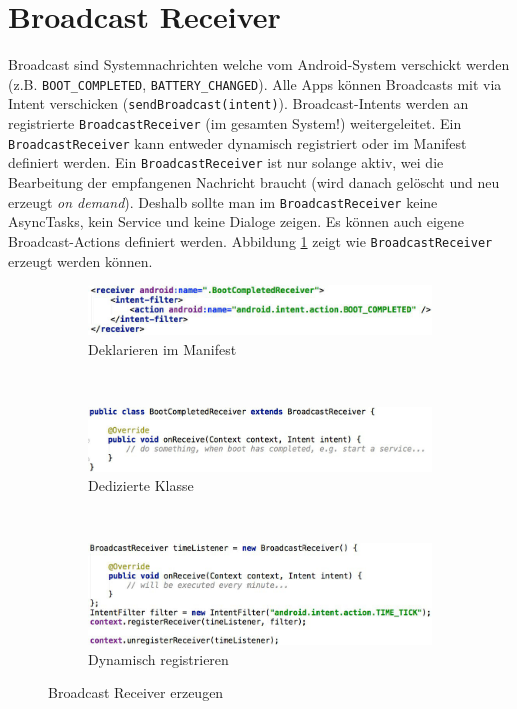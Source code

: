 \section{Broadcast Receiver}

Broadcast sind Systemnachrichten welche vom Android-System verschickt werden (z.B. \texttt{BOOT\_COMPLETED}, \texttt{BATTERY\_CHANGED}). Alle Apps können Broadcasts mit via Intent verschicken (\texttt{sendBroadcast(intent)}). Broadcast-Intents werden an registrierte \texttt{BroadcastReceiver} (im gesamten System!) weitergeleitet. Ein \texttt{BroadcastReceiver} kann entweder dynamisch registriert oder im Manifest definiert werden. Ein \texttt{BroadcastReceiver} ist nur solange aktiv, wei die Bearbeitung der empfangenen Nachricht braucht (wird danach gelöscht und neu erzeugt \emph{on demand}). Deshalb sollte man im \texttt{BroadcastReceiver} keine AsyncTasks, kein Service und keine Dialoge zeigen. Es können auch eigene Broadcast-Actions definiert werden. Abbildung \ref{fig:broadcast-receiver} zeigt wie \texttt{BroadcastReceiver} erzeugt werden können.

\begin{figure}
	\centering
	\begin{subfigure}[b]{0.48\textwidth}
		\includegraphics[width=\textwidth]{fig/broadcast-receiver-manifest}
		\caption{Deklarieren im Manifest}
	\end{subfigure}
	~
	\begin{subfigure}[b]{0.48\textwidth}
		\includegraphics[width=\textwidth]{fig/broadcast-receiver-manifest-klasse}
		\caption{Dedizierte Klasse}
	\end{subfigure}
	~
	\begin{subfigure}[b]{0.48\textwidth}
		\includegraphics[width=\textwidth]{fig/broadcast-receiver-dynamisch}
		\caption{Dynamisch registrieren}
	\end{subfigure}
	\caption{Broadcast Receiver erzeugen}
	\label{fig:broadcast-receiver}
\end{figure}

